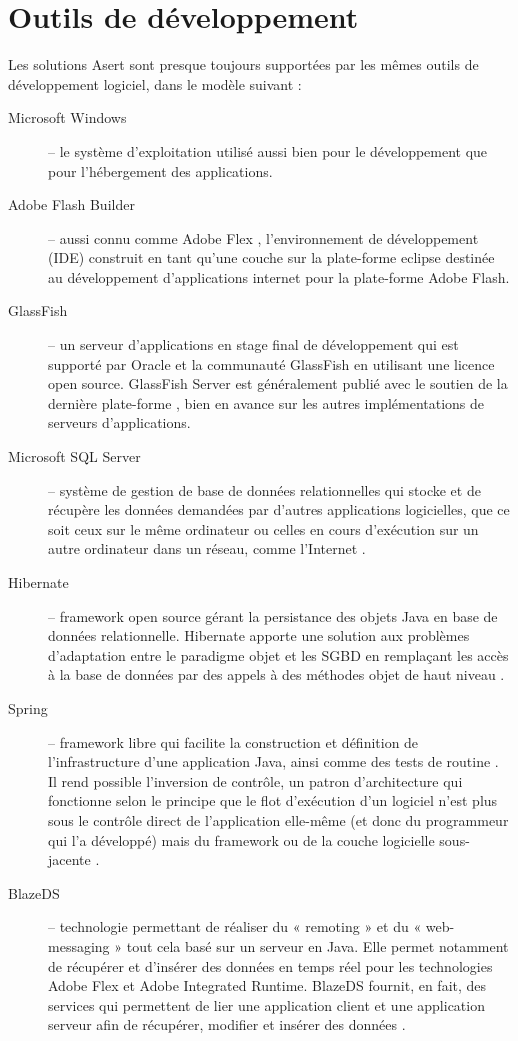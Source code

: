 \section{Outils de développement}

Les solutions Asert sont presque toujours supportées par les mêmes outils de développement logiciel, dans le modèle suivant :
\begin{description}
\item[Microsoft Windows] -- le système d'exploitation utilisé aussi bien pour le développement que pour l'hébergement des applications.
\item[Adobe Flash Builder] -- aussi connu comme Adobe Flex \cite{flex}, l'environnement de développement (IDE) construit en tant qu'une couche sur la plate-forme \Gls{eclipse} destinée au développement d'applications internet pour la plate-forme Adobe Flash.
\item[GlassFish] -- un serveur d'applications en stage final de développement qui est supporté par Oracle et la communauté GlassFish en utilisant une licence open source. GlassFish Server \cite{glassfish} est généralement publié avec le soutien de la dernière plate-forme \cite{jee}, bien en avance sur les autres implémentations de serveurs d'applications.
\item[Microsoft SQL Server] -- système de gestion de base de données relationnelles qui stocke et de récupère les données demandées par d'autres applications logicielles, que ce soit ceux sur le même ordinateur ou celles en cours d'exécution sur un autre ordinateur dans un réseau, comme l'Internet \cite{sql-server}.
\item[Hibernate] -- framework open source gérant la persistance des objets Java en base de données relationnelle. Hibernate apporte une solution aux problèmes d'adaptation entre le paradigme objet et les \gls{SGBD} en remplaçant les accès à la base de données par des appels à des méthodes objet de haut niveau \cite{hibernate}.
\item[Spring] -- framework libre qui facilite la construction et définition de l'infrastructure d'une application Java, ainsi comme des tests de routine \cite{spring}. Il rend possible l'inversion de contrôle, un patron d'architecture qui fonctionne selon le principe que le flot d'exécution d'un logiciel n'est plus sous le contrôle direct de l'application elle-même (et donc du programmeur qui l'a développé) mais du framework ou de la couche logicielle sous-jacente \cite{wiki-ioc}.
\item[BlazeDS] -- technologie permettant de réaliser du « remoting » et du « web-messaging » tout cela basé sur un serveur en Java. Elle permet notamment de récupérer et d'insérer des données en temps réel pour les technologies Adobe Flex et Adobe Integrated Runtime. BlazeDS fournit, en fait, des services qui permettent de lier une application client et une application serveur afin de récupérer, modifier et insérer des données \cite{blazeds}.

\end{description}
